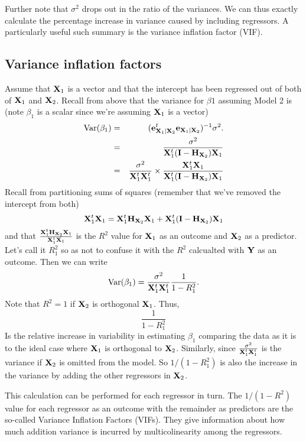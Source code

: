 Further note that $\sigma^2$ drops out in the ratio of the variances. We can thus
exactly calculate the percentage increase in variance caused by including regressors.
A particularly useful such summary is the variance inflation factor (VIF). 

\subsection{Variance inflation factors}
Assume that $\mathbf{X}_1$ is a vector and that the intercept has been regressed out of 
both of $\mathbf{X}_1$ and $\mathbf{X}_2$. Recall from above that the variance for $\beta1$ assuming
Model 2 is (note $\beta_1$ is a scalar since we're assuming $\mathbf{X}_1$ is a vector)
\begin{eqnarray*}
\mbox{Var}(\beta_1) & = & (\mathbf{e}_{\mathbf{X}_1 | \mathbf{X}_2}^t \mathbf{e}_{\mathbf{X}_1 | \mathbf{X}_2})^{-1} \sigma^2.\\
& = & \frac{\sigma^2}{\mathbf{X}_1^t (\mathbf{I} - \mathbf{H}_{\mathbf{X}_2}) \mathbf{X}_1} \\
& = & \frac{\sigma^2}{\mathbf{X}_1^t \mathbf{X}_1^t} \times \frac{\mathbf{X}_1^t \mathbf{X}_1}{\mathbf{X}_1^t (\mathbf{I} - \mathbf{H}_{\mathbf{X}_2}) \mathbf{X}_1}
\end{eqnarray*}
Recall from partitioning sums of squares (remember that we've removed the intercept from both)
$$
\mathbf{X}_1^t\mathbf{X}_1 = \mathbf{X}_1^t \mathbf{H}_{\mathbf{X}_2} \mathbf{X}_1 + \mathbf{X}_1^t (\mathbf{I} - \mathbf{H}_{\mathbf{X}_2}) \mathbf{X}_1
$$
and that $\frac{\mathbf{X}_1^t \mathbf{H}_{\mathbf{X}_2} \mathbf{X}_1}{\mathbf{X}_1^t\mathbf{X}_1}$ is the $R^2$ value for $\mathbf{X}_1$
as an outcome and $\mathbf{X}_2$ as a predictor. Let's call it $R^2_1$ so as not to confuse
it with the $R^2$ calcualted with $\mathbf{Y}$ as an outcome. Then we can write
$$
\mbox{Var}(\beta_1) =  \frac{\sigma^2}{\mathbf{X}_1^t \mathbf{X}_1^t} \frac{1}{1 - R^2_1}.
$$
Note that $R^2 = 1$ if $\mathbf{X}_2$ is orthogonal $\mathbf{X}_1$. Thus,
$$
\frac{1}{1 - R^2_1}
$$
Is the relative increase in variability in estimating $\beta_1$
comparing the data as it is to the ideal case where $\mathbf{X}_1$ is orthogonal to $\mathbf{X}_2$. 
Similarly, since $\frac{\sigma^2}{\mathbf{X}_1^t \mathbf{X}_1^t}$ is the variance if $\mathbf{X}_2$ is omitted
from the model. So $1 / (1 - R^2_1)$ is also the increase in the variance by adding the
other regressors in $\mathbf{X}_2$.

This calculation can be performed for each regressor in turn. The $1 / (1 - R^2)$ value
for each regressor as an outcome with the remainder as predictors are the so-called
Variance Inflation Factors (VIFs). They give information about how much addition
variance is incurred by multicolinearity among the regressors.

